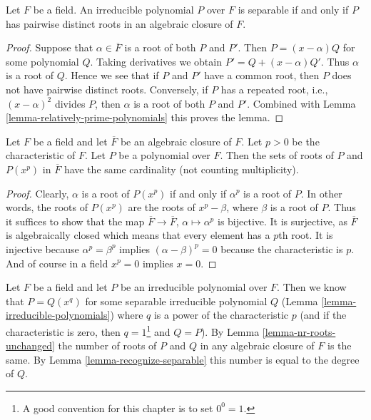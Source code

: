 \begin{lemma}
\label{lemma-recognize-separable}
Let $F$ be a field. An irreducible polynomial $P$ over $F$
is separable if and only if $P$ has pairwise distinct roots in an
algebraic closure of $F$.
\end{lemma}

\begin{proof}
Suppose that $\alpha \in \overline{F}$ is a root of both $P$ and $P'$.
Then $P = (x - \alpha)Q$ for some polynomial $Q$. Taking derivatives
we obtain $P' = Q + (x - \alpha)Q'$. Thus $\alpha$ is a root of $Q$.
Hence we see that if $P$ and $P'$ have a common root, then $P$
does not have pairwise distinct roots. Conversely, if $P$ has
a repeated root, i.e., $(x - \alpha)^2$ divides $P$, then $\alpha$
is a root of both $P$ and $P'$. Combined with
Lemma \ref{lemma-relatively-prime-polynomials} this proves the lemma.
\end{proof}

\begin{lemma}
\label{lemma-nr-roots-unchanged}
Let $F$ be a field and let $\overline{F}$ be an algebraic closure of $F$.
Let $p > 0$ be the characteristic of $F$. Let $P$ be a polynomial
over $F$. Then the sets of roots of $P$ and $P(x^p)$ in $\overline{F}$
have the same cardinality (not counting multiplicity).
\end{lemma}

\begin{proof}
Clearly, $\alpha$ is a root of $P(x^p)$ if and only if $\alpha^p$ is a
root of $P$. In other words, the roots of $P(x^p)$ are the roots of
$x^p - \beta$, where $\beta$ is a root of $P$. Thus it suffices to show
that the map $\overline{F} \to \overline{F}$, $\alpha \mapsto \alpha^p$
is bijective. It is surjective, as $\overline{F}$ is algebraically closed
which means that every element has a $p$th root. It is injective because
$\alpha^p = \beta^p$ implies $(\alpha - \beta)^p = 0$ because
the characteristic is $p$. And of course in a field $x^p = 0$ implies
$x = 0$.
\end{proof}

\noindent
Let $F$ be a field and let $P$ be an irreducible polynomial over $F$.
Then we know that $P = Q(x^q)$ for some separable irreducible polynomial $Q$
(Lemma \ref{lemma-irreducible-polynomials}) where $q$ is a power of
the characteristic $p$ (and if the characteristic is zero, then
$q = 1$\footnote{A good convention for this chapter is to set $0^0 = 1$.}
and $Q = P$). By Lemma \ref{lemma-nr-roots-unchanged} the number of
roots of $P$ and $Q$ in any algebraic closure of $F$ is the same.
By Lemma \ref{lemma-recognize-separable} this number is equal to the degree
of $Q$.

